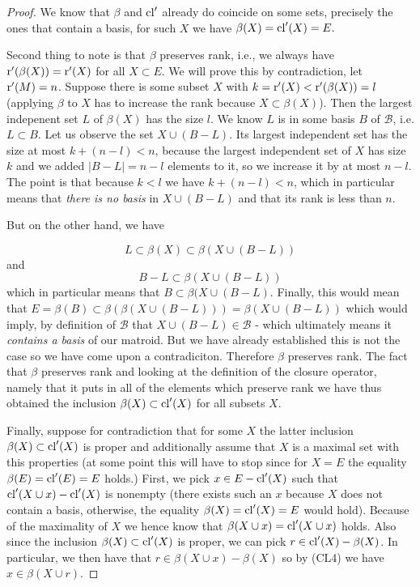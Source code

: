 \begin{proof}
We know that $\beta$ and $\mathrm{cl}'$ already do coincide on some sets, precisely the ones that contain a basis, for such $X$ we have $\beta(X) = \mathrm{cl}'(X) = E.$

Second thing to note is that $\beta$ preserves rank, i.e., we always have $\text{r}'(\beta(X)) = \text{r}'(X)$ for all $X\subset E$. We will prove this by contradiction, let $\text{r}'(M) = n$. Suppose there is some subset $X$ with $k  = \text{r}'(X)<\text{r}'(\beta(X)) = l$ (applying $\beta$ to $X$ has to increase the rank because $X \subset \beta(X)$). Then the largest indepenent set $L$ of $\beta(X)$ has the size $l$. We know $L$ is in some basis $B$ of $\mathcal{B}$, i.e. $L \subset B$. Let us observe the set $X \cup (B-L)$.  Its largest independent set has the size at most $k + (n-l)<n$, because the largest independent set of $X$ has size $k$ and we added $|B-L| = n - l$ elements to it, so we increase it by at most $n-l$. The point is that because $k<l$ we have $k + (n-l)<n$, which in particular means that \textit{there is no basis} in $X \cup (B-L)$ and that its rank is less than $n.$


But on the other hand, we have

$$L \subset \beta(X) \subset \beta(X \cup (B-L))$$ and $$B-L \subset \beta(X \cup (B-L))$$ which in particular means that $B \subset \beta(X \cup (B-L)$. Finally, this would mean that  
$E = \beta(B)\subset \beta(\beta(X \cup (B-L))) = \beta(X \cup (B-L))$ which would imply, by definition of $\mathcal{B}$ that $X \cup (B-L)
\in \mathcal{B}$ - which ultimately means it \textit{contains a basis} of our matroid. But we have already established this is not the case so we have come upon a contradiciton. Therefore $\beta$ preserves rank.
The fact that $\beta$ preserves rank and looking at the definition of the closure operator, namely that it puts in all of the elements which preserve rank we have thus obtained the inclusion $\beta(X) \subset \mathrm{cl}'(X)$ for all subsets $X.$

Finally, suppose for contradiction that for some $X$ the latter inclusion $\beta(X) \subset \mathrm{cl}'(X)$ is proper and additionally assume that $X$ is a maximal set with this properties (at some point this will have to stop since for $X =E$ the equality $\beta(E) = \mathrm{cl}'(E) = E$ holds.) First, we pick $x \in E - \mathrm{cl}'(X)$ such that $\mathrm{cl}'(X\cup x) - \mathrm{cl}'(X)$ is nonempty (there exists such an $x$ because $X$ does not contain a basis, otherwise, the equality $\beta(X) = \mathrm{cl}'(X) = E$ would hold).
Because of the maximality of $X$ we hence know that $\beta(X\cup x) = \mathrm{cl}'(X \cup x)$ holds. Also since the inclusion $\beta(X) \subset \mathrm{cl}'(X)$ is proper, we can pick $r \in \mathrm{cl}'(X) - \beta(X)$. In particular, we then have that $r \in \beta(X\cup x) - \beta(X)$ so by (CL4) we have $x \in \beta(X\cup r)$.


\end{proof}
